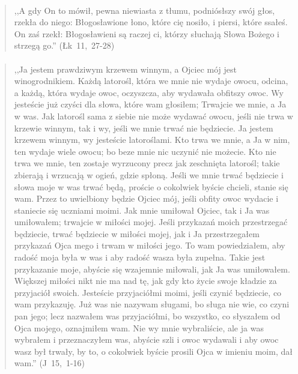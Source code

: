 \documentclass[10pt,a4paper,oneside]{article}
\begin{document}
\paragraph{}
\begin{quote}
,,A gdy On to mówił, pewna niewiasta z tłumu, podniósłszy swój głos, rzekła do niego: Błogosławione łono, które cię nosiło, i piersi, które ssałeś. On zaś rzekł: Błogosławieni są raczej ci, którzy słuchają Słowa Bożego i strzegą go.'' \mbox{(Łk 11, 27-28)}
\end{quote}
\paragraph{}
\begin{quote}
,,Ja jestem prawdziwym krzewem winnym, a Ojciec mój jest winogrodnikiem. Każdą latorośl, która we mnie nie wydaje owocu, odcina, a każdą, która wydaje owoc, oczyszcza, aby wydawała obfitszy owoc. Wy jesteście już czyści dla słowa, które wam głosiłem; Trwajcie we mnie, a Ja w was. Jak latorośl sama z siebie nie może wydawać owocu, jeśli nie trwa w krzewie winnym, tak i wy, jeśli we mnie trwać nie będziecie. Ja jestem krzewem winnym, wy jesteście latoroślami. Kto trwa we mnie, a Ja w nim, ten wydaje wiele owocu; bo beze mnie nic uczynić nie możecie. Kto nie trwa we mnie, ten zostaje wyrzucony precz jak zeschnięta latorośl; takie zbierają i wrzucają w ogień, gdzie spłoną. Jeśli we mnie trwać będziecie i słowa moje w was trwać będą, proście o cokolwiek byście chcieli, stanie się wam. Przez to uwielbiony będzie Ojciec mój, jeśli obfity owoc wydacie i staniecie się uczniami moimi. Jak mnie umiłował Ojciec, tak i Ja was umiłowałem; trwajcie w miłości mojej. Jeśli przykazań moich przestrzegać będziecie, trwać będziecie w miłości mojej, jak i Ja przestrzegałem przykazań Ojca mego i trwam w miłości jego. To wam powiedziałem, aby radość moja była w was i aby radość wasza była zupełna. Takie jest przykazanie moje, abyście się wzajemnie miłowali, jak Ja was umiłowałem. Większej miłości nikt nie ma nad tę, jak gdy kto życie swoje kładzie za przyjaciół swoich. Jesteście przyjaciółmi moimi, jeśli czynić będziecie, co wam przykazuję. Już was nie nazywam sługami, bo sługa nie wie, co czyni pan jego; lecz nazwałem was przyjaciółmi, bo wszystko, co słyszałem od Ojca mojego, oznajmiłem wam. Nie wy mnie wybraliście, ale ja was wybrałem i przeznaczyłem was, abyście szli i owoc wydawali i aby owoc wasz był trwały, by to, o cokolwiek byście prosili Ojca w imieniu moim, dał wam.'' \mbox{(J 15, 1-16)}
\end{quote}
\end{document}
